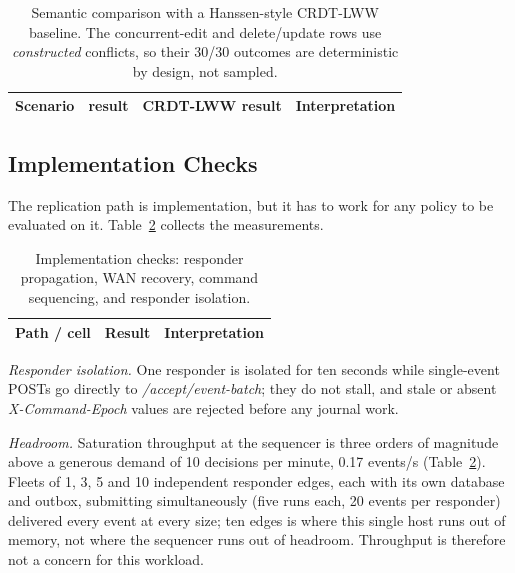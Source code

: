 \begin{table}[t]
\centering
\caption{Semantic comparison with a Hanssen-style CRDT-LWW baseline. The concurrent-edit and delete/update rows use \emph{constructed} conflicts, so their 30/30 outcomes are deterministic by design, not sampled.}
\label{tab:crdt-comparison}
\scriptsize
\setlength{\tabcolsep}{3pt}
\begin{tabularx}{\textwidth}{@{}>{\raggedright\arraybackslash}p{}>{\raggedright\arraybackslash}p{}>{\raggedright\arraybackslash}p{}>{\raggedright\arraybackslash}X@{}}
\toprule
\textbf{Scenario} & \textbf{\systemname{} result} & \textbf{CRDT-LWW result} & \textbf{Interpretation} \\
\midrule

\end{tabularx}
\end{table}

\subsection{Implementation Checks}
\label{sec:eval-independence}
\label{sec:eval-m1}
\label{sec:eval-m2}
\label{sec:eval-m3}
\label{sec:eval-fleet}
\label{sec:eval-schedule}
\label{sec:eval-wan}

The replication path is implementation, but it has to work for any policy to be
evaluated on it. Table~\ref{tab:evaluation} collects the measurements.

\begin{table}[t]
\centering
\caption{Implementation checks: responder propagation, WAN recovery, command sequencing, and responder isolation.}
\label{tab:evaluation}
\scriptsize
\setlength{\tabcolsep}{3pt}
\begin{tabularx}{\columnwidth}{@{}>{\raggedright\arraybackslash}p{}>{\raggedright\arraybackslash}p{}>{\raggedright\arraybackslash}X@{}}
\toprule
\textbf{Path / cell} & \textbf{Result} & \textbf{Interpretation} \\
\midrule

\end{tabularx}
\end{table}

\textit{Responder isolation.} One responder is isolated for ten seconds while
single-event POSTs go directly to \textit{/accept/event-batch}; they do not stall, and
stale or absent \textit{X-Command-Epoch} values are rejected before any journal work.

\textit{Headroom.} Saturation throughput at the sequencer is three orders of magnitude
above a generous demand of 10 decisions per minute, 0.17 events/s
(Table~\ref{tab:evaluation}). Fleets of 1, 3, 5 and 10 independent responder edges, each
with its own database and outbox, submitting simultaneously (five runs each, 20 events per
responder) delivered every event at every size; ten edges is where this single host runs
out of memory, not where the sequencer runs out of headroom. Throughput is therefore not
a concern for this workload.

